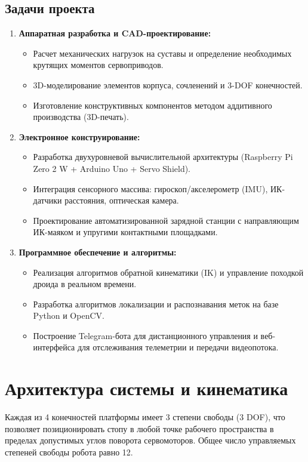 \documentclass[11pt, a4paper]{article}
\begin{document}
\subsection{Задачи проекта}
\begin{enumerate}[leftmargin=*]
    \item \textbf{Аппаратная разработка и CAD-проектирование:}
    \begin{itemize}
        \item Расчет механических нагрузок на суставы и определение необходимых крутящих моментов сервоприводов.
        \item 3D-моделирование элементов корпуса, сочленений и 3-DOF конечностей.
        \item Изготовление конструктивных компонентов методом аддитивного производства (3D-печать).
    \end{itemize}
    \item \textbf{Электронное конструирование:}
    \begin{itemize}
        \item Разработка двухуровневой вычислительной архитектуры (Raspberry Pi Zero 2 W + Arduino Uno + Servo Shield).
        \item Интеграция сенсорного массива: гироскоп/акселерометр (IMU), ИК-датчики расстояния, оптическая камера.
        \item Проектирование автоматизированной зарядной станции с направляющим ИК-маяком и упругими контактными площадками.
    \end{itemize}
    \item \textbf{Программное обеспечение и алгоритмы:}
    \begin{itemize}
        \item Реализация алгоритмов обратной кинематики (IK) и управление походкой дроида в реальном времени.
        \item Разработка алгоритмов локализации и распознавания меток на базе Python и OpenCV.
        \item Построение Telegram-бота для дистанционного управления и веб-интерфейса для отслеживания телеметрии и передачи видеопотока.
    \end{itemize}
\end{enumerate}

\section{Архитектура системы и кинематика}
Каждая из 4 конечностей платформы имеет 3 степени свободы (3 DOF), что позволяет позиционировать стопу в любой точке рабочего пространства в пределах допустимых углов поворота сервомоторов. Общее число управляемых степеней свободы робота равно 12.
\end{document}
